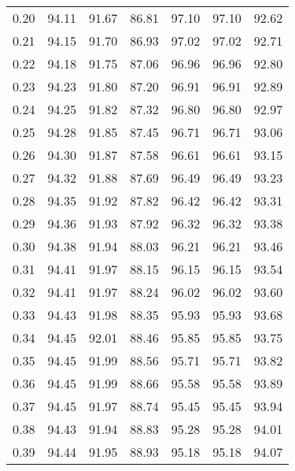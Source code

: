\begin{tabular}{|c|c|c|c|c|c|c|}
      0.20 &     94.11 &     91.67 &      86.81 &   97.10 &      97.10 &         92.62 \\
      0.21 &     94.15 &     91.70 &      86.93 &   97.02 &      97.02 &         92.71 \\
      0.22 &     94.18 &     91.75 &      87.06 &   96.96 &      96.96 &         92.80 \\
      0.23 &     94.23 &     91.80 &      87.20 &   96.91 &      96.91 &         92.89 \\
      0.24 &     94.25 &     91.82 &      87.32 &   96.80 &      96.80 &         92.97 \\
      0.25 &     94.28 &     91.85 &      87.45 &   96.71 &      96.71 &         93.06 \\
      0.26 &     94.30 &     91.87 &      87.58 &   96.61 &      96.61 &         93.15 \\
      0.27 &     94.32 &     91.88 &      87.69 &   96.49 &      96.49 &         93.23 \\
      0.28 &     94.35 &     91.92 &      87.82 &   96.42 &      96.42 &         93.31 \\
      0.29 &     94.36 &     91.93 &      87.92 &   96.32 &      96.32 &         93.38 \\
      0.30 &     94.38 &     91.94 &      88.03 &   96.21 &      96.21 &         93.46 \\
      0.31 &     94.41 &     91.97 &      88.15 &   96.15 &      96.15 &         93.54 \\
      0.32 &     94.41 &     91.97 &      88.24 &   96.02 &      96.02 &         93.60 \\
      0.33 &     94.43 &     91.98 &      88.35 &   95.93 &      95.93 &         93.68 \\
      0.34 &     94.45 &     92.01 &      88.46 &   95.85 &      95.85 &         93.75 \\
      0.35 &     94.45 &     91.99 &      88.56 &   95.71 &      95.71 &         93.82 \\
      0.36 &     94.45 &     91.99 &      88.66 &   95.58 &      95.58 &         93.89 \\
      0.37 &     94.45 &     91.97 &      88.74 &   95.45 &      95.45 &         93.94 \\
      0.38 &     94.43 &     91.94 &      88.83 &   95.28 &      95.28 &         94.01 \\
      0.39 &     94.44 &     91.95 &      88.93 &   95.18 &      95.18 &         94.07 \\

\end{tabular}
